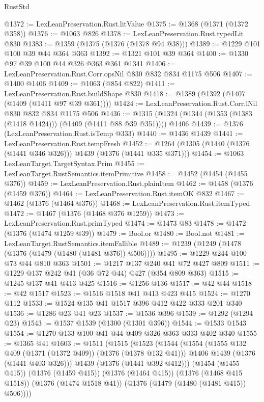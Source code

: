 \begin{lexlean}{RustStd}
\begin{coremodule}
{\begin{coremodule}
{{{{{@1372 := LexLeanPreservation.Rust.litValue
@1375 := @1368 (@1371 (@1372 @358))
@1376 := @1063 @826
@1378 := LexLeanPreservation.Rust.typedLit @830
@1383 := @1359 (@1375 (@1376 (@1378 @94 @38)))
@1389 := @1229 @101 @100 @39 @44 @364 @363
@1392 := @1321 @101 @39 @364
@1400 := @1330 @97 @39 @100 @44 @326 @363 @361 @1341
@1406 := LexLeanPreservation.Rust.Corr.opsNil @830 @832 @834 @1175 @506
@1407 := @1400 @1406
@1409 := @1063 (@854 @822)
@1411 := LexLeanPreservation.Rust.buildShape @830
@1418 := @1389 (@1392 (@1407 (@1409 (@1411 @97 @39 @361))))
@1424 := LexLeanPreservation.Rust.Corr.lNil @830 @832 @834 @1175 @506
@1436 := @1315 (@1324 (@1344 (@1353 (@1383 (@1418 @1424))) (@1409 (@1411 @88 @39 @351)))) @1406
@1439 := @1376 (LexLeanPreservation.Rust.isTemp @333)
@1440 := @1436 @1439
@1441 := LexLeanPreservation.Rust.tempFresh
@1452 := @1264 (@1305 (@1440 (@1376 (@1441 @346 @326))) @1439 (@1376 (@1441 @335 @371)))
@1454 := @1063 LexLeanTarget.TargetSyntax.Prim
@1455 := LexLeanTarget.RustSemantics.itemPrimitive
@1458 := @1452 (@1454 (@1455 @376))
@1459 := LexLeanPreservation.Rust.plainItem
@1462 := @1458 (@1376 (@1459 @376))
@1464 := LexLeanPreservation.Rust.itemOK @832
@1467 := @1462 (@1376 (@1464 @376))
@1468 := LexLeanPreservation.Rust.itemTyped
@1472 := @1467 (@1376 (@1468 @376 @1259))
@1473 := LexLeanPreservation.Rust.primTyped
@1474 := @1473 @83
@1478 := @1472 (@1376 (@1474 @1259 @39))
@1479 := Bool.or
@1480 := Bool.not
@1481 := LexLeanTarget.RustSemantics.itemFallible
@1489 := @1239 (@1249 (@1478 (@1376 (@1479 (@1480 (@1481 @376)) @506))))
@1495 := @1229 @244 @100 @73 @44 @810 @363
@1501 := @1217 @137 @240 @41 @72 @427 @809
@1511 := @1229 @137 @242 @41 (@36 @72 @44) @427 (@354 @809 @363)
@1515 := @1245 @137 @41 @413 @425
@1516 := @1256 @136
@1517 := @42 @44
@1518 := @42 @1517
@1523 := @1516 @1518 @41 @413 @423 @415
@1524 := @1270 @112
@1533 := @1524 @135 @41 @1517 @396 @412 @422 @333 @201 @340
@1536 := @1286 @23 @41 @23
@1537 := @1536 @396
@1539 := @1292 (@1294 @23)
@1543 := @1537 @1539 (@1300 (@1301 @396))
@1544 := @1533 @1543
@1554 := @1270 @133 @100 @41 @44 @409 @326 @363 @333 @402 @340
@1555 := @1365 @41
@1603 := @1511
    (@1515
      (@1523
        (@1544
          (@1554
            (@1555 @132 @409 (@1371 (@1372 @409)) (@1376 (@1378 @132 @41)))
            @1406
            @1439
            (@1376 (@1441 @403 @326)))
          @1439
          (@1376 (@1441 @392 @412)))
        (@1454 (@1455 @415))
        (@1376 (@1459 @415))
        (@1376 (@1464 @415))
        (@1376 (@1468 @415 @1518))
        (@1376 (@1474 @1518 @41))
        (@1376 (@1479 (@1480 (@1481 @415)) @506))))
}}}}}
\end{coremodule}}
\end{coremodule}
\end{lexlean}

